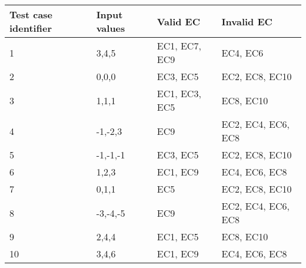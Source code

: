 \begin{table}
    \begin{tabular}{|l|l|l|l|}
        \hline
        Test case identifier & Input values & Valid EC      & Invalid EC         \\ \hline
        1                    & 3,4,5        & EC1, EC7, EC9 & EC4, EC6           \\ 
        2                    & 0,0,0        & EC3, EC5      & EC2, EC8, EC10     \\ 
        3                    & 1,1,1        & EC1, EC3, EC5 & EC8, EC10          \\ 
        4                    & -1,-2,3      & EC9           & EC2, EC4, EC6, EC8 \\ 
        5                    & -1,-1,-1     & EC3, EC5      & EC2, EC8, EC10     \\ 
        6                    & 1,2,3        & EC1, EC9      & EC4, EC6, EC8      \\ 
        7                    & 0,1,1        & EC5           & EC2, EC8, EC10     \\ 
        8                    & -3,-4,-5     & EC9           & EC2, EC4, EC6, EC8 \\ 
        9                    & 2,4,4        & EC1, EC5      & EC8, EC10          \\ 
        10                   & 3,4,6        & EC1, EC9      & EC4, EC6, EC8      \\
        \hline
    \end{tabular}
\end{table}






